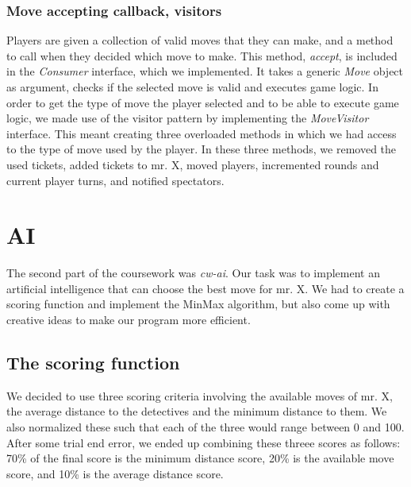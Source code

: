 \documentclass[12pt,a4paper]{scrartcl}
\begin{document}
\subsubsection*{Move accepting callback, visitors}
Players are given a collection of valid moves that they can make, and a method to call when they decided which move to make. This method, \textit{accept},  is included in the \textit{Consumer} interface, which we implemented. It takes a generic \textit{Move} object as argument, checks if the selected move is valid and executes game logic. In order to get the type of move the player selected and to be able to execute game logic, we made use of the visitor pattern by implementing the \textit{MoveVisitor} interface. This meant creating three overloaded methods in which we had access to the type of move used by the player. In these three methods, we removed the used tickets, added tickets to mr. X, moved players, incremented rounds and current player turns, and notified spectators.

\section{AI}
The second part of the coursework was \textit{cw-ai}. Our task was to implement an artificial intelligence that can choose the best move for mr. X. We had to create a scoring function and implement the MinMax algorithm, but also come up with creative ideas to make our program more efficient.

\subsection*{The scoring function}
We decided to use three scoring criteria involving the available moves of mr. X, the average distance to the detectives and the minimum distance to them. We also normalized these such that each of the three would range between 0 and 100. After some trial end error, we ended up combining these threee scores as follows: 70\% of the final score is the minimum distance score, 20\% is the available move score, and 10\% is the average distance score.
\end{document}
